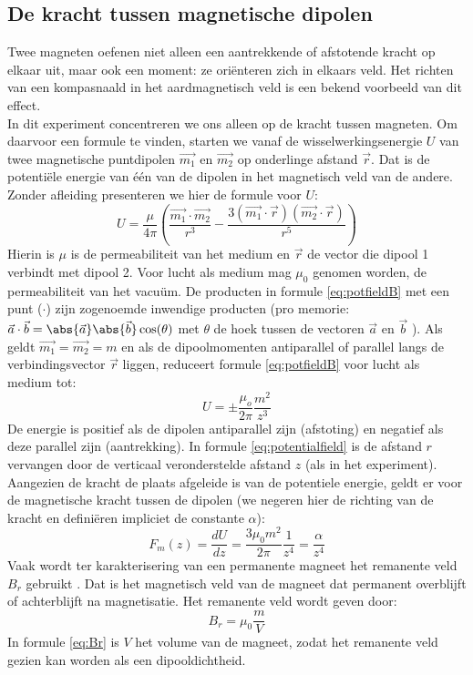 \subsection{De kracht tussen magnetische dipolen}
Twee magneten oefenen niet alleen een aantrekkende of afstotende kracht op elkaar uit, maar ook een moment: ze ori\"{e}nteren zich in elkaars veld. Het richten van een kompasnaald in het aardmagnetisch veld is een bekend voorbeeld van dit effect.\\

In dit experiment concentreren we ons alleen op de kracht tussen magneten. Om daarvoor een formule te vinden, starten we vanaf de wisselwerkingsenergie $U$ van twee magnetische puntdipolen \(\vec{m_1}\) en \(\vec{m_2}\) op onderlinge afstand \(\vec{r}\). Dat is de potenti\"{e}le energie van één van de dipolen in het magnetisch veld van de andere. Zonder afleiding presenteren we hier de formule voor $U$:
%
\begin{equation}\label{eq:potfieldB}
    U=\frac{\mu}{4\pi}\left(\frac{\vec{m_1}\cdot\vec{m_2}}{r^3}-\frac{3(\vec{m_1}\cdot\vec{r})(\vec{m_2}\cdot\vec{r})}{r^5}\right )
\end{equation}
%
Hierin is $\mu$ is de permeabiliteit van het medium en \(\vec{r}\) de vector die dipool 1 verbindt met dipool 2. Voor lucht als medium mag $\mu_0$ genomen worden, de permeabiliteit van het vacuüm. De producten in formule \ref{eq:potfieldB} met een punt ($\cdot$) zijn zogenoemde inwendige
producten (pro memorie: \(\vec{a}\cdot\vec{b}=\abs{\vec{a}}\abs{\vec{b}}\cos(\theta)\) met $\theta$ de hoek tussen de vectoren \(\vec{a}\) en \(\vec{b}\) ). Als geldt  \(\vec{m_1}=\vec{m_2}=m\) en als de dipoolmomenten antiparallel of parallel langs de verbindingsvector \(\vec{r}\) liggen, reduceert formule \ref{eq:potfieldB} voor lucht als medium tot:
%
\begin{equation}\label{eq:potentialfield}
     U=\pm \frac{\mu_o}{2\pi}\frac{m^2}{z^3}
\end{equation}
%
De energie is positief als de dipolen antiparallel zijn (afstoting) en negatief als deze parallel zijn (aantrekking). In formule \ref{eq:potentialfield} is de afstand $r$ vervangen door de verticaal veronderstelde afstand $z$ (als in het experiment). Aangezien de kracht de plaats afgeleide is van de potentiele energie, geldt er voor de magnetische kracht tussen de dipolen (we negeren hier de richting van de kracht en defini\"{e}ren impliciet de constante $\alpha$):
%
\begin{equation} \label{eq:model}
    F_m(z) = \frac{dU}{dz} = \frac{3\mu_0m^2}{2\pi}\frac{1}{z^4}=\frac{\alpha}{z^4}
\end{equation}
%
Vaak wordt ter karakterisering van een permanente magneet het remanente veld $B_r$ gebruikt \citep{supermagnete_data_sheet_s-10-05-npdf_2011}. Dat is het magnetisch veld van de magneet dat permanent overblijft of achterblijft na magnetisatie. Het remanente veld wordt geven door:
%
\begin{equation}\label{eq:Br}
    B_r = \mu_0 \frac{m}{V}
\end{equation}
%
In formule \ref{eq:Br} is $V$ het volume van de magneet, zodat het remanente veld gezien kan worden als een dipool\-dichtheid.\\

